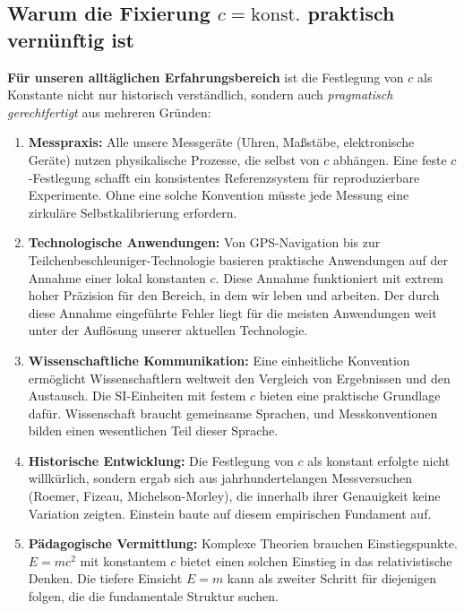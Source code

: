	\subsection{Warum die Fixierung \( c = \text{konst.} \) praktisch vernünftig ist}
	
	\textbf{Für unseren alltäglichen Erfahrungsbereich} ist die Festlegung von \( c \) als Konstante nicht nur historisch verständlich, sondern auch \textit{pragmatisch gerechtfertigt} aus mehreren Gründen:
	
	\begin{enumerate}[leftmargin=*, label=\textbf{\arabic*.}]
		\item \textbf{Messpraxis:} Alle unsere Messgeräte (Uhren, Maßstäbe, elektronische Geräte) nutzen physikalische Prozesse, die selbst von \( c \) abhängen. Eine feste \( c \)-Festlegung schafft ein konsistentes Referenzsystem für reproduzierbare Experimente. Ohne eine solche Konvention müsste jede Messung eine zirkuläre Selbstkalibrierung erfordern.
		
		\item \textbf{Technologische Anwendungen:} Von GPS-Navigation bis zur Teilchenbeschleuniger-Technologie basieren praktische Anwendungen auf der Annahme einer lokal konstanten \( c \). Diese Annahme funktioniert mit extrem hoher Präzision für den Bereich, in dem wir leben und arbeiten. Der durch diese Annahme eingeführte Fehler liegt für die meisten Anwendungen weit unter der Auflösung unserer aktuellen Technologie.
		
		\item \textbf{Wissenschaftliche Kommunikation:} Eine einheitliche Konvention ermöglicht Wissenschaftlern weltweit den Vergleich von Ergebnissen und den Austausch. Die SI-Einheiten mit festem \( c \) bieten eine praktische Grundlage dafür. Wissenschaft braucht gemeinsame Sprachen, und Messkonventionen bilden einen wesentlichen Teil dieser Sprache.
		
		\item \textbf{Historische Entwicklung:} Die Festlegung von \( c \) als konstant erfolgte nicht willkürlich, sondern ergab sich aus jahrhundertelangen Messversuchen (Roemer, Fizeau, Michelson-Morley), die innerhalb ihrer Genauigkeit keine Variation zeigten. Einstein baute auf diesem empirischen Fundament auf.
		
		\item \textbf{Pädagogische Vermittlung:} Komplexe Theorien brauchen Einstiegspunkte. \( E = mc^2 \) mit konstantem \( c \) bietet einen solchen Einstieg in das relativistische Denken. Die tiefere Einsicht \( E = m \) kann als zweiter Schritt für diejenigen folgen, die die fundamentale Struktur suchen.
	\end{enumerate}
	
